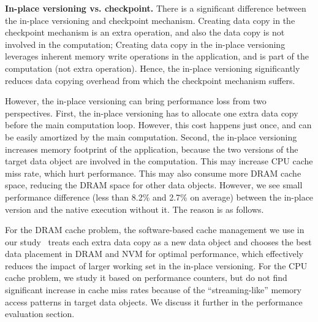 

\textbf{In-place versioning vs. checkpoint.} 
There is a significant difference between the in-place versioning and checkpoint mechanism. 
Creating data copy in the checkpoint mechanism is an extra operation,
and also the data copy is not involved in the computation; 
Creating data copy in the in-place versioning 
leverages inherent memory write operations in the application,
and is part of the computation (not extra operation).
Hence, the in-place versioning significantly reduces data copying overhead
from which the checkpoint mechanism suffers. 

However, the in-place versioning can bring performance loss from two perspectives. First, the in-place versioning has to allocate one extra data copy before the main computation loop. However, this cost happens just once, and can be easily amortized by the main computation.
Second, the in-place versioning increases memory footprint of the application, because the two versions of the target data object are involved in the computation. This may increase CPU cache miss rate, which hurt performance. This may also consume more DRAM cache space,
reducing the DRAM space for other data objects.
However, we see small performance difference (less than 8.2\% and 2.7\% on average) between the in-place version and the native execution without it. The reason is as follows.

For the DRAM cache problem, the software-based cache management we use 
in our study~\cite{eurosys16:dulloor} treats each extra data copy as a new data object and chooses the best data placement in DRAM and NVM for optimal performance, which effectively reduces the impact of larger working set in the in-place versioning.  
For the CPU cache problem, we study it based on performance counters, but do not find significant increase in cache miss rates because of the ``streaming-like'' memory access patterns in target data objects. We discuss it further in the performance evaluation section.


